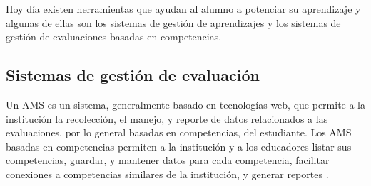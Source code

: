 

Hoy día existen herramientas que ayudan al alumno a potenciar su aprendizaje y algunas de ellas son los sistemas de gestión de aprendizajes y los sistemas de gestión de evaluaciones basadas en competencias.

\subsection{Sistemas de gestión de evaluación}
Un AMS es un sistema, generalmente basado en tecnologías web, que permite a la institución la recolección, el manejo, y reporte de datos relacionados a las evaluaciones, por lo general basadas en competencias, del estudiante. Los AMS basadas en competencias permiten a la institución y a los educadores listar sus competencias, guardar, y mantener datos para cada competencia, facilitar conexiones a competencias similares de la institución, y generar reportes \citep{cartwright2009student}.



